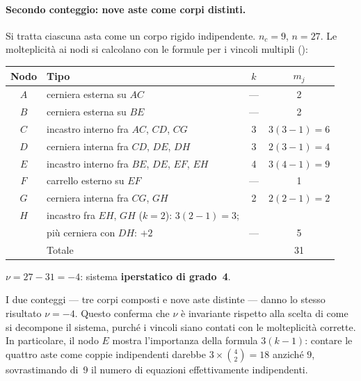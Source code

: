 \begin{esempio}
	\paragraph{Secondo conteggio: nove aste come corpi distinti.}
	Si tratta ciascuna asta come un corpo rigido
	indipendente. $n_c = 9$, $n = 27$. Le molteplicità
	ai nodi si calcolano con le formule per i vincoli
	multipli ():
	\begin{center}
		\renewcommand{\arraystretch}{1.5}
		\small
		\begin{tabular}{clcc}
			\toprule
			Nodo & Tipo & $k$ & $m_j$ \\
			\midrule
			$A$ & cerniera esterna su $AC$
			& --- & 2 \\
			$B$ & cerniera esterna su $BE$
			& --- & 2 \\
			$C$ & incastro interno fra $AC$, $CD$, $CG$
			& 3 & $3(3-1) = 6$ \\
			$D$ & cerniera interna fra $CD$, $DE$, $DH$
			& 3 & $2(3-1) = 4$ \\
			$E$ & incastro interno fra $BE$, $DE$, $EF$, $EH$
			& 4 & $3(4-1) = 9$ \\
			$F$ & carrello esterno su $EF$
			& --- & 1 \\
			$G$ & cerniera interna fra $CG$, $GH$
			& 2 & $2(2-1) = 2$ \\
			$H$ & incastro fra $EH$, $GH$ ($k=2$):
			$3(2-1) = 3$; & & \\
			& più cerniera con $DH$: $+2$
			& --- & 5 \\
			\midrule
			& Totale & & 31 \\
			\bottomrule
		\end{tabular}
	\end{center}
	$\nu = 27 - 31 = -4$: sistema
	\textbf{iperstatico di grado~4}.
	
	\begin{oss}[Invarianza di $\nu$]
		I due conteggi --- tre corpi composti e nove aste
		distinte --- danno lo stesso risultato $\nu = -4$.
		Questo conferma che $\nu$ è invariante rispetto
		alla scelta di come si decompone il sistema, purché
		i vincoli siano contati con le molteplicità corrette.
		In particolare, il nodo $E$ mostra l'importanza
		della formula $3(k-1)$: contare le quattro aste
		come coppie indipendenti darebbe
		$3 \times \binom{4}{2} = 18$ anziché $9$, sovrastimando
		di~9 il numero di equazioni effettivamente
		indipendenti.
	\end{oss}
\end{esempio}



